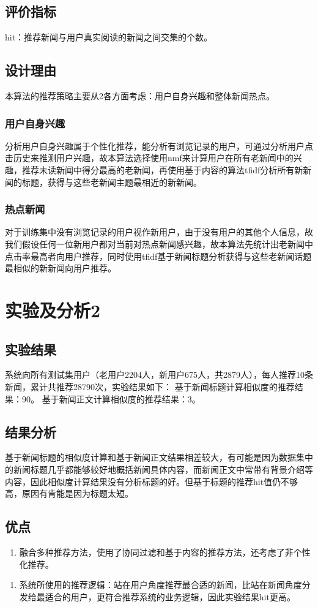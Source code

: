 \documentclass[UTF8]{article}
\begin{document}
\subsection{评价指标}
hit：推荐新闻与用户真实阅读的新闻之间交集的个数。
\subsection{设计理由}
本算法的推荐策略主要从2各方面考虑：用户自身兴趣和整体新闻热点。
\subsubsection{用户自身兴趣}
分析用户自身兴趣属于个性化推荐，能分析有浏览记录的用户，可通过分析用户点击历史来推测用户兴趣，故本算法选择使用nmf来计算用户在所有老新闻中的兴趣，推荐未读新闻中得分最高的老新闻，再使用基于内容的算法tfidf分析所有新新闻的标题，获得与这些老新闻主题最相近的新新闻。
\subsubsection{热点新闻}
对于训练集中没有浏览记录的用户视作新用户，由于没有用户的其他个人信息，故我们假设任何一位新用户都对当前对热点新闻感兴趣，故本算法先统计出老新闻中点击率最高者向用户推荐，同时使用tfidf基于新闻标题分析获得与这些老新闻话题最相似的新新闻向用户推荐。
\section{实验及分析2}
\subsection{实验结果}
系统向所有测试集用户（老用户2204人，新用户675人，共2879人），每人推荐10条新闻，累计共推荐28790次，实验结果如下：
基于新闻标题计算相似度的推荐结果：90。
基于新闻正文计算相似度的推荐结果：3。
\subsection{结果分析}
基于新闻标题的相似度计算和基于新闻正文结果相差较大，有可能是因为数据集中的新闻标题几乎都能够较好地概括新闻具体内容，而新闻正文中常带有背景介绍等内容，因此相似度计算结果没有分析标题的好。但基于标题的推荐hit值仍不够高，原因有肯能是因为标题太短。
\subsection{优点}
\begin{enumerate}{(1)}
	\item 融合多种推荐方法，使用了协同过滤和基于内容的推荐方法，还考虑了非个性化推荐。
\end{enumerate}
\begin{enumerate}{(2)}
	\item 系统所使用的推荐逻辑：站在用户角度推荐最合适的新闻，比站在新闻角度分发给最适合的用户，更符合推荐系统的业务逻辑，因此实验结果hit更高。
\end{enumerate}
\end{document}
